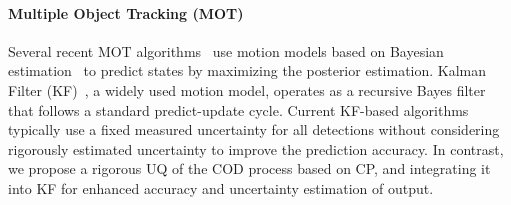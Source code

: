 \paragraph{Multiple Object Tracking (MOT)}\label{subsec:mot}

Several recent MOT algorithms~\cite{zhang2021bytetrack,cao2022observation,wojke2017simple,choi2015near,zhou2020tracking} use motion models based on Bayesian estimation~\cite{lehmann2006theory} to predict states by maximizing the posterior estimation. Kalman Filter (KF)~\cite{kalman1960contributions}, a widely used motion model, operates as a recursive Bayes filter that follows a standard predict-update cycle. 
Current KF-based algorithms typically use a fixed measured uncertainty for all detections without considering rigorously estimated uncertainty to improve the prediction accuracy. In contrast, we propose a rigorous UQ of the COD process based on CP, and integrating it into KF for enhanced accuracy and uncertainty estimation of output.

